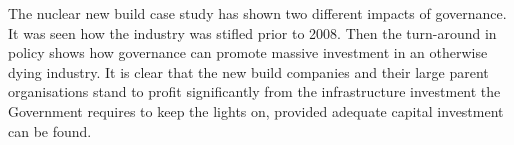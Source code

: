 The nuclear new build case study has shown two different impacts of governance. It was seen how the industry was stifled prior to 2008. Then the turn-around in policy shows how governance can promote massive investment in an otherwise dying industry.
It is clear that the new build companies and their large parent organisations stand to profit significantly from the infrastructure investment the Government requires to keep the lights on, provided adequate capital investment can be found.

